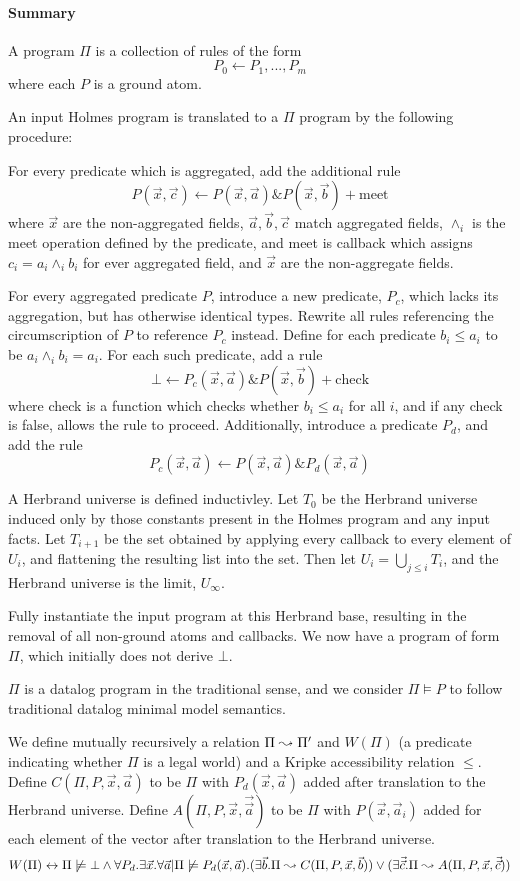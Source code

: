 \paragraph{Summary} 
A program $\Pi$ is a collection of rules of the form
\[
	P_0 \leftarrow P_1, ..., P_m
\]
where each $P$ is a ground atom.

An input Holmes program is translated to a $\Pi$ program by the following procedure:

For every predicate which is aggregated, add the additional rule
\[
	P(\vec{x}, \vec{c}) \leftarrow P(\vec{x}, \vec{a}) \& P(\vec{x}, \vec{b}) + \textrm{meet}
\]
where $\vec{x}$ are the non-aggregated fields, $\vec{a}, \vec{b}, \vec{c}$ match aggregated fields, $\wedge_i$ is the meet operation defined by the predicate, and meet is callback which assigns $c_i = a_i \wedge_i b_i$ for ever aggregated field, and $\vec{x}$ are the non-aggregate fields.

For every aggregated predicate $P$, introduce a new predicate, $P_c$, which lacks its aggregation, but has otherwise identical types.
Rewrite all rules referencing the circumscription of $P$ to reference $P_c$ instead.
Define for each predicate $b_i \leq a_i$ to be $a_i \wedge_i b_i = a_i$.
For each such predicate, add a rule
\[
	\bot \leftarrow P_c(\vec{x}, \vec{a}) \& P(\vec{x}, \vec{b}) + \textrm{check}
\]
where check is a function which checks whether $b_i \leq a_i$ for all $i$, and if any check is false, allows the rule to proceed.
Additionally, introduce a predicate $P_d$, and add the rule
\[
	P_c(\vec{x}, \vec{a}) \leftarrow P(\vec{x}, \vec{a}) \& P_d(\vec{x}, \vec{a})
\]

A Herbrand universe is defined inductivley.
Let $T_0$ be the Herbrand universe induced only by those constants present in the Holmes program and any input facts.
Let $T_{i + 1}$ be the set obtained by applying every callback to every element of $U_i$, and flattening the resulting list into the set.
Then let $U_i = \bigcup_{j \leq i} T_i$, and the Herbrand universe is the limit, $U_\infty$.

Fully instantiate the input program at this Herbrand base, resulting in the removal of all non-ground atoms and callbacks.
We now have a program of form $\Pi$, which initially does not derive $\bot$.

$\Pi$ is a datalog program in the traditional sense, and we consider $\Pi \models P$ to follow traditional datalog minimal model semantics. 

We define mutually recursively a relation $\Pi \leadsto \Pi'$ and $W(\Pi)$ (a predicate indicating whether $\Pi$ is a legal world) and a Kripke accessibility relation $\leq$.
Define $C(\Pi, P, \vec{x}, \vec{a})$ to be $\Pi$ with $P_d(\vec{x}, \vec{a})$ added after translation to the Herbrand universe.
Define $A(\Pi, P, \vec{x}, \vec{\vec{a}})$ to be $\Pi$ with $P(\vec{x}, \vec{a}_i)$ added for each element of the vector after translation to the Herbrand universe.
\[
	W(\Pi) \leftrightarrow \Pi \not \models \bot \wedge \forall P_d. \exists \vec{x}. \forall \vec{a} | \Pi \not \models P_d(\vec{x}, \vec{a}). (\exists \vec{b}. \Pi \leadsto C(\Pi, P, \vec{x}, \vec{b})) \vee (\exists \vec{\vec{c}}. \Pi \leadsto A(\Pi, P, \vec{x}, \vec{\vec{c}}))
\]

